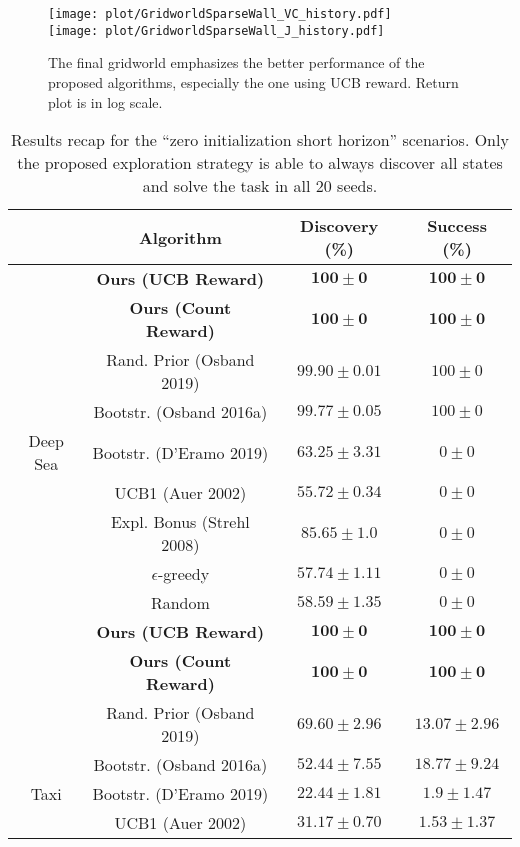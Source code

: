 \documentclass{article}
\begin{document}
\begin{figure}
	\centering
	\texttt{[image: plot/GridworldSparseWall\_VC\_history.pdf]}\\
	\texttt{[image: plot/GridworldSparseWall\_J\_history.pdf]}
	\caption{\label{fig:grid_wall_res}The final gridworld emphasizes the better performance of the proposed algorithms, especially the one using UCB reward. Return plot is in log scale.}
\end{figure}


\clearpage

\begin{table}
	\centering
	\caption{\label{tab:recap}Results recap for the ``zero initialization short horizon'' scenarios. Only the proposed exploration strategy is able to always discover all states and solve the task in all 20 seeds.}
	\begin{tabular}{ c | c | c c }
	& Algorithm & Discovery (\%) & Success (\%) \\
	\hline
	& \textbf{Ours (UCB Reward)} & $\mathbf{100 \pm 0}$ & $\mathbf{100 \pm 0}$ \\
	& \textbf{Ours (Count Reward)} & $\mathbf{100 \pm 0}$ & $\mathbf{100 \pm 0}$ \\
	& Rand. Prior (Osband 2019) & $99.90 \pm 0.01$ & $100 \pm 0$ \\
	& Bootstr. (Osband 2016a) & $99.77 \pm 0.05$ & $100 \pm 0$ \\
	Deep Sea & Bootstr. (D'Eramo 2019) & $63.25 \pm 3.31$ & $0 \pm 0$ \\
	& UCB1 (Auer 2002) & $55.72 \pm 0.34$ & $0 \pm 0$ \\
	& Expl. Bonus (Strehl 2008) & $85.65 \pm 1.0$ & $0 \pm 0$ \\
	& $\epsilon$-greedy & $57.74 \pm 1.11$ & $0 \pm 0$ \\
	& Random & $58.59 \pm 1.35$ & $0 \pm 0$ \\
	\hline
	& \textbf{Ours (UCB Reward)} & $\mathbf{100 \pm 0}$ & $\mathbf{100 \pm 0}$ \\
	& \textbf{Ours (Count Reward)} & $\mathbf{100 \pm 0}$ & $\mathbf{100 \pm 0}$ \\
	& Rand. Prior (Osband 2019) & $69.60 \pm 2.96$ & $13.07 \pm 2.96$ \\
	& Bootstr. (Osband 2016a) & $52.44 \pm 7.55$ & $18.77 \pm 9.24$ \\
	Taxi & Bootstr. (D'Eramo 2019) & $22.44 \pm 1.81$ & $1.9 \pm 1.47$ \\
	& UCB1 (Auer 2002) & $31.17 \pm 0.70$ & $1.53 \pm 1.37$ \\

\end{tabular}
\end{table}
\end{document}
